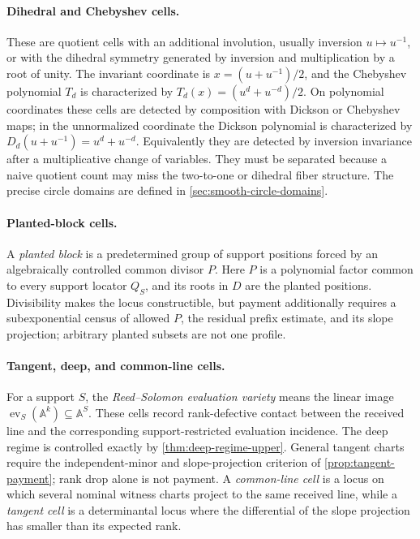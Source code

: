 \documentclass[12pt,a4paper]{amsart}
\numberwithin{equation}{section}
\theoremstyle{remark}
\newcommand{\A}{\mathbb A}
\begin{document}
\paragraph{Dihedral and Chebyshev cells.}
These are quotient cells with an additional involution, usually inversion
\(u\mapsto u^{-1}\), or with the dihedral symmetry generated by inversion
and multiplication by a root of unity.  The invariant coordinate is
\(x=(u+u^{-1})/2\), and the Chebyshev polynomial \(T_d\) is characterized
by \(T_d(x)=(u^d+u^{-d})/2\).  On polynomial coordinates these cells are
detected by composition with Dickson or Chebyshev maps; in the unnormalized
coordinate the Dickson polynomial is characterized by
\(D_d(u+u^{-1})=u^d+u^{-d}\).  Equivalently they are detected by inversion
invariance after a multiplicative change of variables.  They must be
separated because a naive quotient count may miss the two-to-one or
dihedral fiber structure.  The precise circle domains are defined in
\cref{sec:smooth-circle-domains}.

\paragraph{Planted-block cells.}
A \emph{planted block} is a predetermined group of support positions
forced by an
algebraically controlled common divisor \(P\).  Here \(P\) is a polynomial
factor common to every support locator \(Q_S\), and its roots in \(D\) are
the planted positions.  Divisibility makes the
locus constructible, but payment additionally requires a subexponential
census of allowed \(P\), the residual prefix estimate, and its slope
projection; arbitrary planted subsets are not one profile.

\paragraph{Tangent, deep, and common-line cells.}
For a support \(S\), the \emph{Reed--Solomon evaluation variety} means the
linear image \(\operatorname{ev}_S(\A^k)\subseteq\A^S\).  These cells
record rank-defective contact between the received line and the
corresponding support-restricted evaluation incidence.  The deep regime is controlled exactly by
\cref{thm:deep-regime-upper}.  General tangent charts require the
independent-minor and slope-projection criterion of
\cref{prop:tangent-payment}; rank drop alone is not payment.
A \emph{common-line cell} is a locus on which several nominal witness
charts project to the same received line, while a \emph{tangent cell} is a
determinantal locus where the differential of the slope projection has
smaller than its expected rank.
\end{document}

